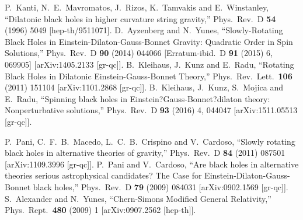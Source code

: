 \begin{small}
\begin{thebibliography}{99}
  P.~Kanti, N.~E.~Mavromatos, J.~Rizos, K.~Tamvakis and E.~Winstanley,
  ``Dilatonic black holes in higher curvature string gravity,''
  Phys.\ Rev.\ D {\bf 54} (1996) 5049
  [hep-th/9511071].
  D.~Ayzenberg and N.~Yunes,
  ``Slowly-Rotating Black Holes in Einstein-Dilaton-Gauss-Bonnet Gravity: Quadratic Order in Spin Solutions,''
  Phys.\ Rev.\ D {\bf 90} (2014) 044066
   [Erratum-ibid.\ D {\bf 91} (2015) 6,  069905]
  [arXiv:1405.2133 [gr-qc]].
  B.~Kleihaus, J.~Kunz and E.~Radu,
  ``Rotating Black Holes in Dilatonic Einstein-Gauss-Bonnet Theory,''
  Phys.\ Rev.\ Lett.\  {\bf 106} (2011) 151104
  [arXiv:1101.2868 [gr-qc]].
  B.~Kleihaus, J.~Kunz, S.~Mojica and E.~Radu,
  ``Spinning black holes in Einstein?Gauss-Bonnet?dilaton theory: Nonperturbative solutions,''
  Phys.\ Rev.\ D {\bf 93} (2016) 4,  044047
  [arXiv:1511.05513 [gr-qc]].

  P.~Pani, C.~F.~B.~Macedo, L.~C.~B.~Crispino and V.~Cardoso,
  ``Slowly rotating black holes in alternative theories of gravity,''
  Phys.\ Rev.\ D {\bf 84} (2011) 087501
  [arXiv:1109.3996 [gr-qc]].
  P.~Pani and V.~Cardoso,
  ``Are black holes in alternative theories serious astrophysical candidates? The Case for Einstein-Dilaton-Gauss-Bonnet black holes,''
  Phys.\ Rev.\ D {\bf 79} (2009) 084031
  [arXiv:0902.1569 [gr-qc]].
  S.~Alexander and N.~Yunes,
  ``Chern-Simons Modified General Relativity,''
  Phys.\ Rept.\  {\bf 480} (2009) 1
  [arXiv:0907.2562 [hep-th]].


\end{thebibliography}
\end{small}
